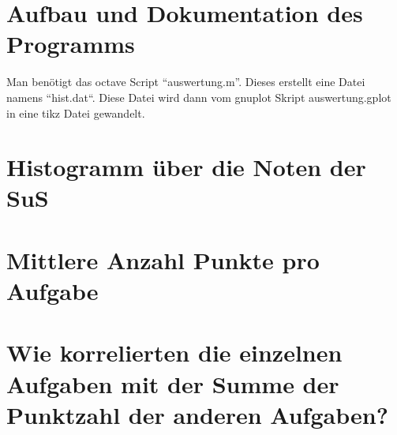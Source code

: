 \documentclass{article}
\def\folder{/tmp/auswertung}
\begin{document}
\section{Aufbau und Dokumentation des Programms}
Man benötigt das octave Script ``auswertung.m''. Dieses erstellt eine Datei namens ``hist.dat``. 
Diese Datei wird dann vom gnuplot Skript auswertung.gplot in eine tikz Datei gewandelt.

\newpage

\section{Histogramm über die Noten der SuS}




\section{Mittlere Anzahl Punkte pro Aufgabe}


\section{Wie korrelierten die einzelnen Aufgaben mit der Summe der Punktzahl der anderen Aufgaben?}





\end{document}
